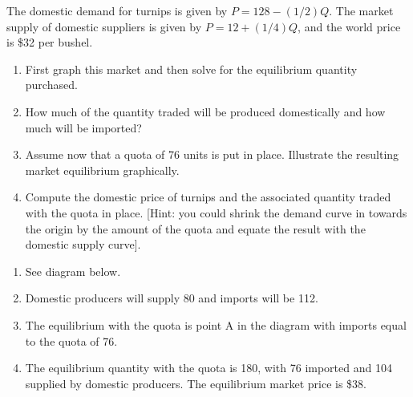 \begin{enumialphparenastyle}
\begin{ex}\label{ex:ch15ex6}
The domestic demand for turnips is given by $P=128-(1/2)Q$. The market supply of domestic suppliers is given by $P=12+(1/4)Q$, and the world price is \$32 per bushel. 
\begin{enumerate}
\item  First graph this market and then solve for the equilibrium quantity purchased.
\item  How much of the quantity traded will be produced domestically and how much will be imported?
\item  Assume now that a quota of 76 units is put in place. Illustrate the resulting market equilibrium graphically.
\item  Compute the domestic price of turnips and the associated quantity traded with the quota in place. [Hint: you could shrink the demand curve in towards the origin by the amount of the quota and equate the result with the domestic supply curve].
\end{enumerate}
\begin{sol}
\begin{enumerate}
	\item	See diagram below.
	\item	Domestic producers will supply 80 and imports will be 112.
	\item	The equilibrium with the quota is point A in the diagram with imports equal to the quota of 76.
	\item	The equilibrium quantity with the quota is 180, with 76 imported and 104 supplied by domestic producers. The equilibrium market price is \$38.
\end{enumerate}
\begin{center}
\end{center}
\end{sol}
\end{ex}
\end{enumialphparenastyle}
